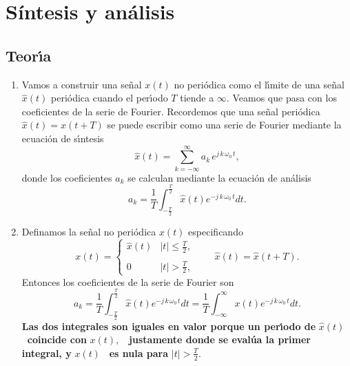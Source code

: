\section{Síntesis y análisis}

\subsection{Teor\'{\i}a}

\begin{enumerate}

        \item  Vamos a construir una se\~{n}al $x\left( t\right) $ no peri\'{o}dica como el l\'{\i}mite de 
        una se\~{n}al $\hat{x}\left( t\right) $ peri\'{o}dica cuando el per\'{\i}odo $T$ tiende a 
        $\infty .$ Veamos que pasa con los coeficientes de la serie de Fourier. 
        Recordemos que una se\~{n}al peri\'{o}dica $\hat{x}\left( t\right) =\hat{x}\left( t+T\right) $ 
        se puede escribir como una serie de Fourier mediante la ecuaci\'{o}n de s\'{\i}ntesis 
        \begin{equation}
                \hat{x}\left( t\right) =\sum_{k=-\infty }^{\infty }a_{k} \, e^{j \, k \, \omega_{0} \, t},
        \end{equation}
        donde los coeficientes $a_{k}$ se calculan mediante la ecuaci\'{o}n de an\'{a}lisis 
        \begin{equation}
            a_{k}=\frac{1}{T}\int_{-\frac{T}{2}}^{\frac{T}{2}}\hat{x}\left( t\right) e^{-j \, k \, \omega_{0} \, t}dt.
        \end{equation}

        \item  Definamos la se\~{n}al no peri\'{o}dica $x(t)$ especificando 
        \begin{equation}
                x\left( t\right) =
                        \left\{ \begin{array}{ll}
                                \hat{x}\left( t\right) & \left| t\right| \leq \frac{T}{2}, \\
                                & \\
                                0 & \left| t\right| >\frac{T}{2},
                                \end{array} 
                        \right. \qquad
                        \hat{x}\left( t\right) =\hat{x}\left( t+T\right) .
        \end{equation}
        Entonces los coeficientes de la serie de Fourier son 
        \begin{equation}
           a_{k}=
                  \frac{1}{T}\int_{-\frac{T}{2}}^{\frac{T}{2}}\hat{x}\left( t\right)e^{-j \, k \, \omega_{0} \, t}dt=
                  \frac{1}{T}\int_{-\infty }^{\infty }x\left( t\right)e^{-j \, k \, \omega_{0} \, t}dt.
        \end{equation}
        \textbf{Las dos integrales son iguales en valor porque un per\'{\i}odo de }
        $\hat{x}\left( t\right) $  \textbf{\ coincide con }$x\left( t\right) ,$ 
        \textbf{\ justamente donde se eval\'{u}a la primer integral, y } $x\left(t\right) $
        \textbf{\ es nula para }$\left| t\right| >\frac{T}{2}.$


\end{enumerate}

